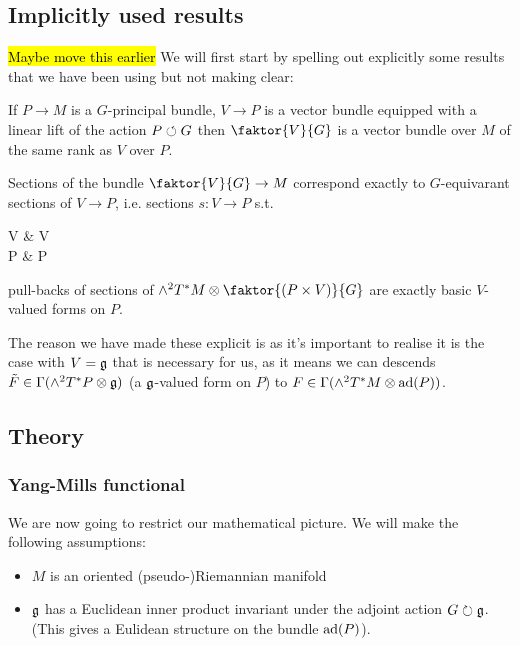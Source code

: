 \documentclass{article}
\begin{document}
\subsection{Implicitly used results}

\hl{Maybe move this earlier}
We will first start by spelling out explicitly some results that we have been using but not making clear:

\begin{lemma}
	If $P \to M$ is a $G$-principal bundle, $V \to P$ is a vector bundle equipped with a linear lift of the action $P \circlearrowleft G$ then $\faktor{V}{G}$ is a vector bundle over $M$ of the same rank as $V$ over $P$. 
\end{lemma}

\begin{lemma}
	Sections of the bundle $\faktor{V}{G} \to M$ correspond exactly to $G$-equivarant sections of $V \to P$, i.e. sections $s:V\to P$ s.t. 
	\begin{tkz}
	V \arrow[r,"g"] \arrow[d] & V \arrow[d] \\ P \arrow[r,"g"'] \arrow[u,bend left=20,"s"] & P \arrow[u,bend right=20, "s"']
	\end{tkz} 
\end{lemma}

\begin{lemma}
	pull-backs of sections of $\wedge^2 T^\ast M \otimes \faktor{(P \times V)}{G}$ are exactly basic $V$-valued forms on $P$. 
\end{lemma}

The reason we have made these explicit is as it's important to realise it is the case with $V= \mathfrak{g}$ that is necessary for us, as it means we can descends $\tilde{F} \in \Gamma(\wedge^2 T^\ast P \otimes \mathfrak{g})$ (a $\mathfrak{g}$-valued form on $P$) to $F\in \Gamma(\wedge^2 T^\ast M \otimes \operatorname{ad}(P))$. 


\subsection{Theory}
\subsubsection{Yang-Mills functional}
We are now going to restrict our mathematical picture. We will make the following assumptions:
\begin{itemize}
	\item $M$ is an oriented (pseudo-)Riemannian manifold
	\item $\mathfrak{g}$ has a Euclidean inner product invariant under the adjoint action $G \circlearrowright \mathfrak{g}$. (This gives a Eulidean structure on the bundle $\operatorname{ad}(P)$). 
\end{itemize}
\end{document}
